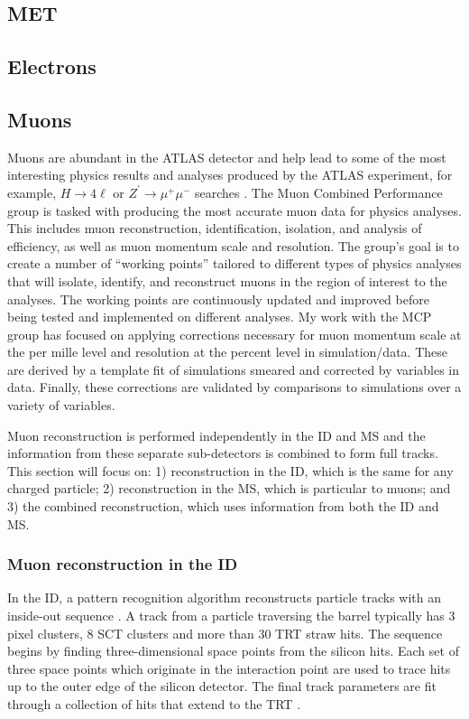 \subsection{MET}
\subsection{Electrons}
\subsection{Muons}
Muons are abundant in the ATLAS detector and help lead to some of the most interesting physics results and analyses produced by the ATLAS experiment, for example, $H \rightarrow 4\ell$ or $Z^\prime \rightarrow \mu^+\mu^-$ searches \cite{4l}. The Muon Combined Performance group is tasked with producing the most accurate muon data for physics analyses. This includes muon reconstruction, identification, isolation, and analysis of efficiency, as well as muon momentum scale and resolution. The group's goal is to create a number of ``working points'' tailored to different types of physics analyses that will isolate, identify, and reconstruct muons in the region of interest to the analyses. The working points are continuously updated and improved before being tested and implemented on different analyses. My work with the MCP group has focused on applying corrections necessary for muon momentum scale at the per mille level and resolution at the percent level in simulation/data. These are derived by a template fit of simulations smeared and corrected by variables in data. Finally, these corrections are validated by comparisons to simulations over a variety of variables. 

Muon reconstruction is performed independently in the ID and MS and the information from these separate sub-detectors is combined to form full tracks. This section will focus on: 1) reconstruction in the ID, which is the same for any charged particle; 2) reconstruction in the MS, which is particular to muons; and 3) the combined reconstruction, which uses information from both the ID and MS. 

\subsubsection{Muon reconstruction in the ID}
In the ID, a pattern recognition algorithm reconstructs particle tracks with an inside-out sequence \cite{patternrecognition}. A track from a particle traversing the barrel typically has 3 pixel clusters, 8 SCT clusters and more than 30 TRT straw hits. The sequence begins by finding three-dimensional space points from the silicon hits. Each set of three space points which originate in the  interaction point are used to trace hits up to the outer edge of the silicon detector. The final track parameters are fit through a collection of hits that extend to the TRT \cite{IDreconstruction}.

